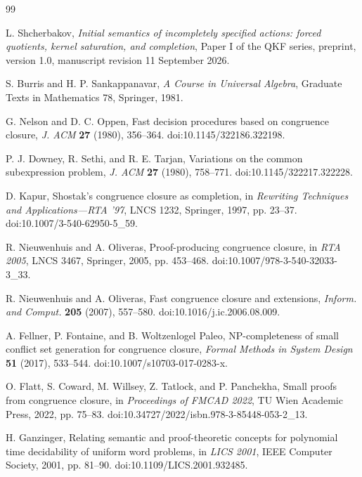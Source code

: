 \begin{thebibliography}{99}

L. Shcherbakov,
\emph{Initial semantics of incompletely specified actions: forced quotients, kernel saturation, and completion},
Paper I of the QKF series, preprint, version 1.0, manuscript revision 11 September 2026.


S. Burris and H. P. Sankappanavar,
\emph{A Course in Universal Algebra},
Graduate Texts in Mathematics 78, Springer, 1981.

G. Nelson and D. C. Oppen,
Fast decision procedures based on congruence closure,
\emph{J. ACM} \textbf{27} (1980), 356--364.
\newblock doi:10.1145/322186.322198.

P. J. Downey, R. Sethi, and R. E. Tarjan,
Variations on the common subexpression problem,
\emph{J. ACM} \textbf{27} (1980), 758--771.
\newblock doi:10.1145/322217.322228.

D. Kapur,
Shostak's congruence closure as completion,
in \emph{Rewriting Techniques and Applications---RTA '97},
LNCS 1232, Springer, 1997, pp. 23--37.
\newblock doi:10.1007/3-540-62950-5\_59.

R. Nieuwenhuis and A. Oliveras,
Proof-producing congruence closure,
in \emph{RTA 2005}, LNCS 3467, Springer, 2005, pp. 453--468.
\newblock doi:10.1007/978-3-540-32033-3\_33.

R. Nieuwenhuis and A. Oliveras,
Fast congruence closure and extensions,
\emph{Inform. and Comput.} \textbf{205} (2007), 557--580.
\newblock doi:10.1016/j.ic.2006.08.009.

A. Fellner, P. Fontaine, and B. Woltzenlogel Paleo,
NP-completeness of small conflict set generation for congruence closure,
\emph{Formal Methods in System Design} \textbf{51} (2017), 533--544.
\newblock doi:10.1007/s10703-017-0283-x.

O. Flatt, S. Coward, M. Willsey, Z. Tatlock, and P. Panchekha,
Small proofs from congruence closure,
in \emph{Proceedings of FMCAD 2022}, TU Wien Academic Press, 2022, pp. 75--83.
\newblock doi:10.34727/2022/isbn.978-3-85448-053-2\_13.

H. Ganzinger,
Relating semantic and proof-theoretic concepts for polynomial time decidability of uniform word problems,
in \emph{LICS 2001}, IEEE Computer Society, 2001, pp. 81--90.
\newblock doi:10.1109/LICS.2001.932485.


\end{thebibliography}
